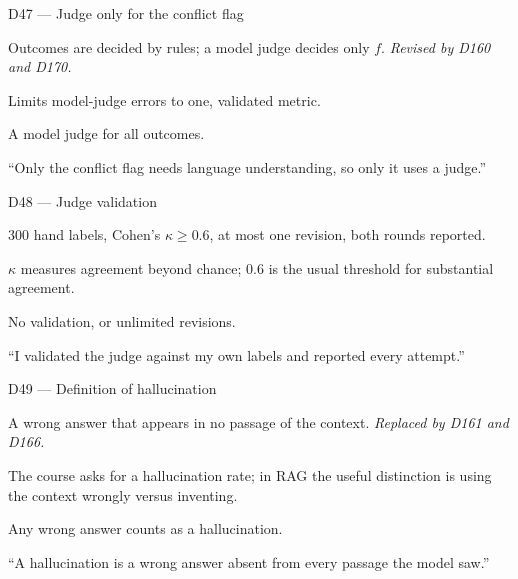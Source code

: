 \documentclass[11pt,a4paper]{report}
\begin{document}
\begin{decisionbox}{D47 --- Judge only for the conflict flag}
\begin{description}[nosep, leftmargin=0pt]
  \item[Decision.] Outcomes are decided by rules; a model judge decides only $f$. \emph{Revised by D160 and D170.}
  \item[Why.] Limits model-judge errors to one, validated metric.
  \item[Alternatives.] A model judge for all outcomes.
  \item[Interview line.] ``Only the conflict flag needs language understanding, so only it uses a judge.''
\end{description}
\end{decisionbox}

\begin{decisionbox}{D48 --- Judge validation}
\begin{description}[nosep, leftmargin=0pt]
  \item[Decision.] 300 hand labels, Cohen's $\kappa \ge 0.6$, at most one revision, both rounds reported.
  \item[Why.] $\kappa$ measures agreement beyond chance; 0.6 is the usual threshold for substantial agreement.
  \item[Alternatives.] No validation, or unlimited revisions.
  \item[Interview line.] ``I validated the judge against my own labels and reported every attempt.''
\end{description}
\end{decisionbox}

\begin{decisionbox}{D49 --- Definition of hallucination}
\begin{description}[nosep, leftmargin=0pt]
  \item[Decision.] A wrong answer that appears in no passage of the context. \emph{Replaced by D161 and D166.}
  \item[Why.] The course asks for a hallucination rate; in RAG the useful distinction is using the context wrongly versus inventing.
  \item[Alternatives.] Any wrong answer counts as a hallucination.
  \item[Interview line.] ``A hallucination is a wrong answer absent from every passage the model saw.''
\end{description}
\end{decisionbox}
\end{document}
